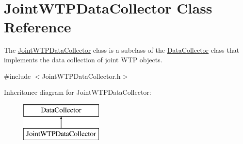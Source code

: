 \hypertarget{classJointWTPDataCollector}{}\section{Joint\+W\+T\+P\+Data\+Collector Class Reference}
\label{classJointWTPDataCollector}


The {\ttfamily \mbox{\hyperlink{classJointWTPDataCollector}{Joint\+W\+T\+P\+Data\+Collector}}} class is a subclass of the {\ttfamily \mbox{\hyperlink{classDataCollector}{Data\+Collector}}} class that implements the data collection of joint W\+TP objects.  




{\ttfamily \#include $<$Joint\+W\+T\+P\+Data\+Collector.\+h$>$}

Inheritance diagram for Joint\+W\+T\+P\+Data\+Collector\+:\begin{figure}[H]
\begin{center}
\leavevmode
\includegraphics[height=2.000000cm]{classJointWTPDataCollector}
\end{center}
\end{figure}
